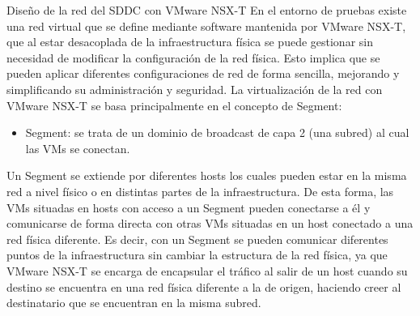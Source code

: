 

\begin{subsubsection}{Diseño de la red del SDDC con VMware NSX-T}
    En el entorno de pruebas existe una red virtual que se define mediante software mantenida por VMware NSX-T, que al estar desacoplada de la infraestructura física se puede gestionar sin necesidad de modificar la configuración de la red física. Esto implica que se pueden aplicar diferentes configuraciones de red de forma sencilla, mejorando y simplificando su administración y seguridad. La virtualización de la red con VMware NSX-T se basa principalmente en el concepto de Segment:
    \begin{itemize}
        \item Segment: se trata de un dominio de broadcast de capa 2 (una subred) al cual las VMs se conectan.
    \end{itemize}
    Un Segment se extiende por diferentes hosts los cuales pueden estar en la misma red a nivel físico o en distintas partes de la infraestructura. De esta forma, las VMs situadas en hosts con acceso a un Segment pueden conectarse a él y comunicarse de forma directa con otras VMs situadas en un host conectado a una red física diferente. Es decir, con un Segment se pueden comunicar diferentes puntos de la infraestructura sin cambiar la estructura de la red física, ya que VMware NSX-T se encarga de encapsular el tráfico al salir de un host cuando su destino se encuentra en una red física diferente a la de origen, haciendo creer al destinatario que se encuentran en la misma subred.


\end{subsubsection}

